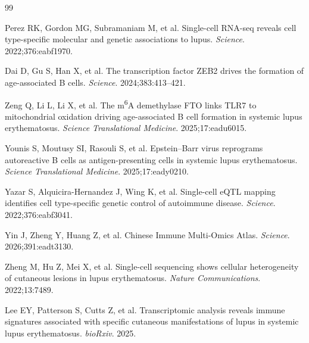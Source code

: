 \begin{thebibliography}{99}

Perez RK, Gordon MG, Subramaniam M, et al.
Single-cell RNA-seq reveals cell type-specific molecular and genetic associations to lupus.
\textit{Science}. 2022;376:eabf1970.

Dai D, Gu S, Han X, et al.
The transcription factor ZEB2 drives the formation of age-associated B cells.
\textit{Science}. 2024;383:413--421.

Zeng Q, Li L, Li X, et al.
The m\textsuperscript{6}A demethylase FTO links TLR7 to mitochondrial oxidation driving age-associated B cell formation in systemic lupus erythematosus.
\textit{Science Translational Medicine}. 2025;17:eadu6015.

Younis S, Moutusy SI, Rasouli S, et al.
Epstein--Barr virus reprograms autoreactive B cells as antigen-presenting cells in systemic lupus erythematosus.
\textit{Science Translational Medicine}. 2025;17:eady0210.

Yazar S, Alquicira-Hernandez J, Wing K, et al.
Single-cell eQTL mapping identifies cell type-specific genetic control of autoimmune disease.
\textit{Science}. 2022;376:eabf3041.

Yin J, Zheng Y, Huang Z, et al.
Chinese Immune Multi-Omics Atlas.
\textit{Science}. 2026;391:eadt3130.

Zheng M, Hu Z, Mei X, et al.
Single-cell sequencing shows cellular heterogeneity of cutaneous lesions in lupus erythematosus.
\textit{Nature Communications}. 2022;13:7489.

Lee EY, Patterson S, Cutts Z, et al.
Transcriptomic analysis reveals immune signatures associated with specific cutaneous manifestations of lupus in systemic lupus erythematosus.
\textit{bioRxiv}. 2025.

\end{thebibliography}

